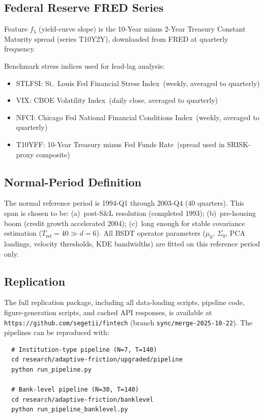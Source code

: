 \documentclass[11pt]{article}
\theoremstyle{definition}
\begin{document}
\begin{appendices}
\subsection{Federal Reserve FRED Series}

Feature $f_5$ (yield-curve slope) is the 10-Year minus 2-Year Treasury
Constant Maturity spread (series T10Y2Y), downloaded from FRED at
quarterly frequency.

Benchmark stress indices used for lead-lag analysis:
\begin{itemize}
  \item STLFSI: St.\ Louis Fed Financial Stress Index~(weekly, averaged to quarterly)
  \item VIX: CBOE Volatility Index~(daily close, averaged to quarterly)
  \item NFCI: Chicago Fed National Financial Conditions Index~(weekly, averaged to quarterly)
  \item T10YFF: 10-Year Treasury minus Fed Funds Rate~(spread used in SRISK-proxy composite)
\end{itemize}

\subsection{Normal-Period Definition}

The normal reference period is 1994-Q1 through 2003-Q4 (40 quarters).
This span is chosen to be:
(a)~post-S\&L resolution (completed 1993);
(b)~pre-housing boom (credit growth accelerated 2004);
(c)~long enough for stable covariance estimation ($T_{\mathrm{ref}} = 40 \gg d = 6$).
All BSDT operator parameters ($\mu_0$, $\Sigma_0$, PCA loadings,
velocity thresholds, KDE bandwidths) are fitted on this reference period only.

\subsection{Replication}

The full replication package, including all data-loading scripts, pipeline code,
figure-generation scripts, and cached API responses, is available
at \texttt{https://github.com/segetii/fintech} (branch \texttt{sync/merge-2025-10-22}).
The pipelines can be reproduced with:
\begin{verbatim}
  # Institution-type pipeline (N=7, T=140)
  cd research/adaptive-friction/upgraded/pipeline
  python run_pipeline.py

  # Bank-level pipeline (N=30, T=140)
  cd research/adaptive-friction/banklevel
  python run_pipeline_banklevel.py


\end{verbatim}
\end{appendices}
\end{document}
